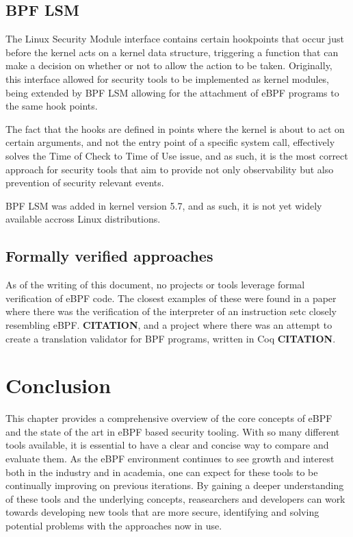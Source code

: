 \subsection{BPF LSM}

The Linux Security Module interface contains certain hookpoints that occur just before the kernel acts on a kernel data structure, triggering a function that can make a decision on whether or not to allow the action to be taken. Originally, this interface allowed for security tools to be implemented as kernel modules, being extended by BPF LSM allowing for the attachment of eBPF programs to the same hook points. 

The fact that the hooks are defined in points where the kernel is about to act on certain arguments, and not the entry point of a specific system call, effectively solves the Time of Check to Time of Use issue, and as such, it is the most correct approach for security tools that aim to provide not only observability but also prevention of security relevant events. 

BPF LSM was added in kernel version 5.7, and as such, it is not yet widely available accross Linux distributions.


\subsection{Formally verified approaches}

As of the writing of this document, no projects or tools leverage formal verification of eBPF code. The closest examples of these were found in a paper where there was the verification of the interpreter of an instruction setc closely resembling eBPF. \textbf{CITATION}, and a project where there was an attempt to create a translation validator for BPF programs, written in Coq \textbf{CITATION}. 


\section{Conclusion}
This chapter provides a comprehensive overview of the core concepts of eBPF and the state of the art in eBPF based security tooling. With so many different tools available, it is essential to have a clear and concise way to compare and evaluate them. As the eBPF environment continues to see growth and interest both in the industry and in academia, one can expect for these tools to be continually improving on previous iterations. By gaining a deeper understanding of these tools and the underlying concepts, reasearchers and developers can work towards developing new tools that are more secure, identifying and solving potential problems with the approaches now in use. 
